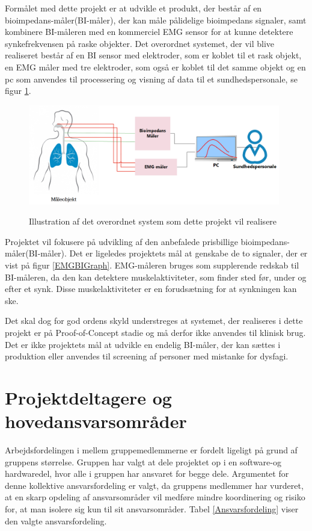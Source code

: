 Formålet med dette projekt er at udvikle et produkt, der består af en bioimpedans-måler(BI-måler), der kan måle pålidelige bioimpedans signaler, samt kombinere BI-måleren med en kommerciel EMG sensor for at kunne detektere synkefrekvensen på raske objekter. Det overordnet systemet, der vil blive realiseret består af en BI sensor med elektroder, som er koblet til et rask objekt, en EMG måler med tre elektroder, som også er koblet til det samme objekt og en pc som anvendes til processering og visning af data til et sundhedspersonale, se figur \ref{KonceptuelDiagram}.  

\begin{figure}[H]
\centering
{\includegraphics[width=11cm]
{Figure/KonceptuelDiagram}}
\caption{Illustration af  det overordnet system som dette projekt vil realisere}
\label{KonceptuelDiagram}
\end{figure}

Projektet vil fokusere på udvikling af den anbefalede prisbillige bioimpedans-måler(BI-måler). Det er ligeledes projektets mål at genskabe de to signaler, der er vist på figur \ref{EMGBIGraph}. EMG-måleren bruges som supplerende redskab til BI-måleren, da den kan detektere muskelaktiviteter, som finder sted før, under og efter et synk. Disse muskelaktiviteter er en forudsætning for at synkningen kan ske. 

Det skal dog for god ordens skyld understreges at systemet, der realiseres i dette projekt er på Proof-of-Concept stadie og må derfor ikke anvendes til klinisk brug. Det er ikke projektets mål at udvikle en endelig BI-måler, der kan sættes i produktion eller anvendes til screening af personer med mistanke for dysfagi. 

\section{Projektdeltagere og hovedansvarsområder} 
Arbejdsfordelingen i mellem gruppemedlemmerne er fordelt ligeligt på grund af gruppens størrelse. Gruppen har valgt at dele projektet op i en software-og hardwaredel, hvor alle i gruppen har ansvaret for  begge dele. Argumentet for denne kollektive ansvarsfordeling er valgt, da gruppens medlemmer har vurderet, at en skarp opdeling af ansvarsområder vil medføre mindre koordinering og risiko for, at man isolere sig kun til sit ansvarsområder. Tabel \ref{Ansvarsfordeling} viser den valgte ansvarsfordeling. 

